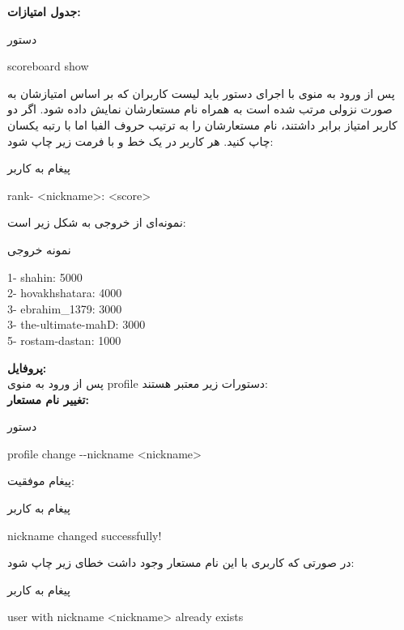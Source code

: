 \documentclass[]{article}
\begin{document}
\vspace{.5cm}
\textbf{جدول امتیازات:}
\begin{mybox}[colback=yellow]{دستور}
	\begin{latin}	
		scoreboard show
	\end{latin}
\end{mybox}
پس از ورود به منوی  با اجرای دستور باید لیست کاربران که بر 
اساس امتیازشان به صورت نزولی مرتب شده است به همراه نام مستعارشان نمایش داده 
شود. اگر دو کاربر امتیاز برابر داشتند، نام مستعارشان را به ترتیب حروف الفبا 
اما با رتبه یکسان چاپ کنید. هر کاربر در یک خط و با فرمت زیر چاپ شود:
\begin{mybox}[colback=yellow]{پیغام به کاربر}
	\begin{latin}	
		rank- <nickname>: <score>
	\end{latin}
\end{mybox}
نمونه‌ای از خروجی به شکل زیر است:
\begin{mybox}[colback=yellow]{نمونه خروجی}
	\begin{latin}	
		1- shahin: 5000 \\
		2- hovakhshatara: 4000 \\
		3- ebrahim\_1379: 3000 \\
		3- the-ultimate-mahD: 3000 \\
		5- rostam-dastan: 1000
	\end{latin}
\end{mybox}

\vspace{.5cm}
\textbf{پروفایل:}
\\
پس از ورود به منوی profile دستورات زیر معتبر هستند:
\\
\vspace{.5cm}
\textbf{تغییر نام مستعار:}
\begin{mybox}[colback=yellow]{دستور}
	\begin{latin}	
		profile change -{}-nickname <nickname>
	\end{latin}
\end{mybox}
پیغام موفقیت:
\begin{mybox}[colback=yellow]{پیغام به کاربر}
	\begin{latin}	
		nickname changed successfully!
	\end{latin}
\end{mybox}
در صورتی که کاربری با این نام مستعار وجود داشت خطای زیر چاپ شود:
\begin{mybox}[colback=yellow]{پیغام به کاربر}
	\begin{latin}	
		user with nickname <nickname> already exists
	\end{latin}
\end{mybox}
\end{document}
